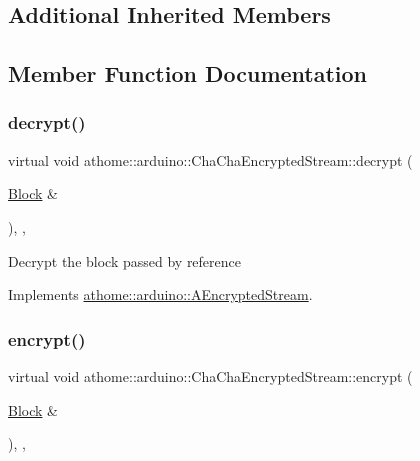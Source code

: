 \subsection*{Additional Inherited Members}


\subsection{Member Function Documentation}
\mbox{\label{classathome_1_1arduino_1_1_cha_cha_encrypted_stream_ae0cd8d9dd46060a08789f0c1b221a400}} 
\subsubsection{\texorpdfstring{decrypt()}{decrypt()}}
{\footnotesize\ttfamily virtual void athome\+::arduino\+::\+Cha\+Cha\+Encrypted\+Stream\+::decrypt (\begin{DoxyParamCaption}\item[{\mbox{\hyperlink{structathome_1_1arduino_1_1_a_encrypted_stream_1_1_block}{Block}} \&}]{ }\end{DoxyParamCaption})\hspace{0.3cm}{\ttfamily [inline]}, {\ttfamily [protected]}, {\ttfamily [virtual]}}

Decrypt the block passed by reference 

Implements \mbox{\hyperlink{classathome_1_1arduino_1_1_a_encrypted_stream_a256c8946f3907cea6cd2dc73e971acd2}{athome\+::arduino\+::\+A\+Encrypted\+Stream}}.

\mbox{\label{classathome_1_1arduino_1_1_cha_cha_encrypted_stream_a34c2613f9f8100c1064f6b6b97a5b0f9}} 
\subsubsection{\texorpdfstring{encrypt()}{encrypt()}}
{\footnotesize\ttfamily virtual void athome\+::arduino\+::\+Cha\+Cha\+Encrypted\+Stream\+::encrypt (\begin{DoxyParamCaption}\item[{\mbox{\hyperlink{structathome_1_1arduino_1_1_a_encrypted_stream_1_1_block}{Block}} \&}]{ }\end{DoxyParamCaption})\hspace{0.3cm}{\ttfamily [inline]}, {\ttfamily [protected]}, {\ttfamily [virtual]}}


